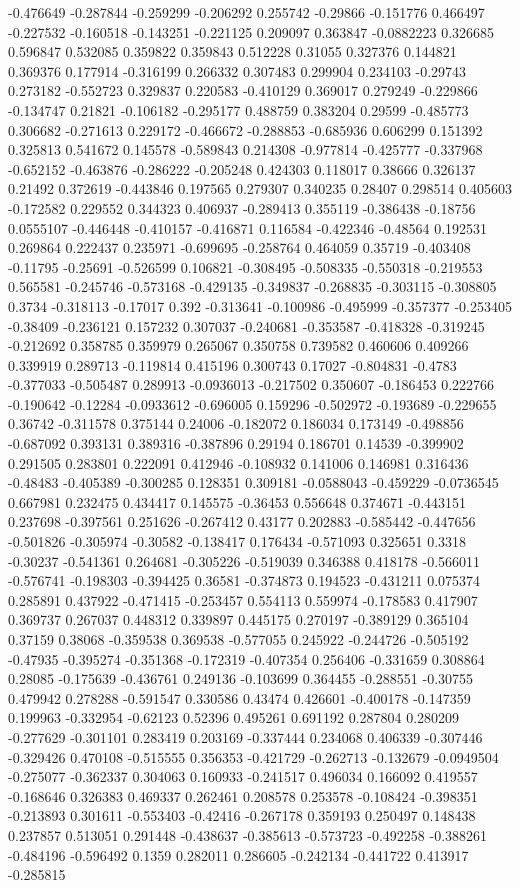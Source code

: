 -0.476649 -0.287844 -0.259299 -0.206292 0.255742 -0.29866 -0.151776 0.466497 -0.227532 -0.160518 -0.143251 -0.221125 0.209097 0.363847 -0.0882223 0.326685 0.596847 0.532085 0.359822 0.359843 0.512228 0.31055 0.327376 0.144821 0.369376 0.177914 -0.316199 0.266332 0.307483 0.299904 0.234103 -0.29743 0.273182 -0.552723 0.329837 0.220583 -0.410129 0.369017 0.279249 -0.229866 -0.134747 0.21821 -0.106182 -0.295177 0.488759 0.383204 0.29599 -0.485773 0.306682 -0.271613 0.229172 -0.466672 -0.288853 -0.685936 0.606299 0.151392 0.325813 0.541672 0.145578 -0.589843 0.214308 -0.977814 -0.425777 -0.337968 -0.652152 -0.463876 -0.286222 -0.205248 0.424303 0.118017 0.38666 0.326137 0.21492 0.372619 -0.443846 0.197565 0.279307 0.340235 0.28407 0.298514 0.405603 -0.172582 0.229552 0.344323 0.406937 -0.289413 0.355119 -0.386438 -0.18756 0.0555107 -0.446448 -0.410157 -0.416871 0.116584 -0.422346 -0.48564 0.192531 0.269864 0.222437 0.235971 -0.699695 -0.258764 0.464059 0.35719 -0.403408 -0.11795 -0.25691 -0.526599 0.106821 -0.308495 -0.508335 -0.550318 -0.219553 0.565581 -0.245746 -0.573168 -0.429135 -0.349837 -0.268835 -0.303115 -0.308805 0.3734 -0.318113 -0.17017 0.392 -0.313641 -0.100986 -0.495999 -0.357377 -0.253405 -0.38409 -0.236121 0.157232 0.307037 -0.240681 -0.353587 -0.418328 -0.319245 -0.212692 0.358785 0.359979 0.265067 0.350758 0.739582 0.460606 0.409266 0.339919 0.289713 -0.119814 0.415196 0.300743 0.17027 -0.804831 -0.4783 -0.377033 -0.505487 0.289913 -0.0936013 -0.217502 0.350607 -0.186453 0.222766 -0.190642 -0.12284 -0.0933612 -0.696005 0.159296 -0.502972 -0.193689 -0.229655 0.36742 -0.311578 0.375144 0.24006 -0.182072 0.186034 0.173149 -0.498856 -0.687092 0.393131 0.389316 -0.387896 0.29194 0.186701 0.14539 -0.399902 0.291505 0.283801 0.222091 0.412946 -0.108932 0.141006 0.146981 0.316436 -0.48483 -0.405389 -0.300285 0.128351 0.309181 -0.0588043 -0.459229 -0.0736545 0.667981 0.232475 0.434417 0.145575 -0.36453 0.556648 0.374671 -0.443151 0.237698 -0.397561 0.251626 -0.267412 0.43177 0.202883 -0.585442 -0.447656 -0.501826 -0.305974 -0.30582 -0.138417 0.176434 -0.571093 0.325651 0.3318 -0.30237 -0.541361 0.264681 -0.305226 -0.519039 0.346388 0.418178 -0.566011 -0.576741 -0.198303 -0.394425 0.36581 -0.374873 0.194523 -0.431211 0.075374 0.285891 0.437922 -0.471415 -0.253457 0.554113 0.559974 -0.178583 0.417907 0.369737 0.267037 0.448312 0.339897 0.445175 0.270197 -0.389129 0.365104 0.37159 0.38068 -0.359538 0.369538 -0.577055 0.245922 -0.244726 -0.505192 -0.47935 -0.395274 -0.351368 -0.172319 -0.407354 0.256406 -0.331659 0.308864 0.28085 -0.175639 -0.436761 0.249136 -0.103699 0.364455 -0.288551 -0.30755 0.479942 0.278288 -0.591547 0.330586 0.43474 0.426601 -0.400178 -0.147359 0.199963 -0.332954 -0.62123 0.52396 0.495261 0.691192 0.287804 0.280209 -0.277629 -0.301101 0.283419 0.203169 -0.337444 0.234068 0.406339 -0.307446 -0.329426 0.470108 -0.515555 0.356353 -0.421729 -0.262713 -0.132679 -0.0949504 -0.275077 -0.362337 0.304063 0.160933 -0.241517 0.496034 0.166092 0.419557 -0.168646 0.326383 0.469337 0.262461 0.208578 0.253578 -0.108424 -0.398351 -0.213893 0.301611 -0.553403 -0.42416 -0.267178 0.359193 0.250497 0.148438 0.237857 0.513051 0.291448 -0.438637 -0.385613 -0.573723 -0.492258 -0.388261 -0.484196 -0.596492 0.1359 0.282011 0.286605 -0.242134 -0.441722 0.413917 -0.285815 